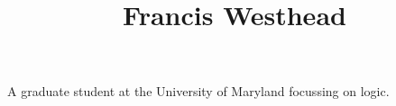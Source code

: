 \documentclass[a4paper]{article}
\title{Francis Westhead}
\date{}
\begin{document}
\maketitle
\par{A graduate student at the University of Maryland focussing on logic.}
\printbibliography
\end{document}
